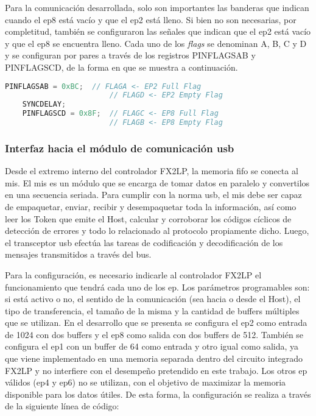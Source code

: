 	Para la comunicación desarrollada, solo son importantes las banderas que indican cuando el \acrshort{ep}8 está vacío y que el \acrshort{ep}2 está lleno. Si bien no son necesarias, por completitud, también se configuraron las señales que indican que el \acrshort{ep}2 está vacío y que el \acrshort{ep}8 se encuentra lleno. Cada uno de los \textit{flags} se denominan A, B, C y D y se configuran por pares a través de los registros PINFLAGSAB y PINFLAGSCD, de la forma en que se muestra a continuación.
	
	\begin{lstlisting}[language=C,backgroundcolor=\color{gray!30}]
	PINFLAGSAB = 0xBC;	// FLAGA <- EP2 Full Flag
						// FLAGD <- EP2 Empty Flag
	SYNCDELAY;
	PINFLAGSCD = 0x8F;	// FLAGC <- EP8 Full Flag
						// FLAGB <- EP8 Empty Flag
	\end{lstlisting}
	
	
\subsubsection{Interfaz hacia el módulo de comunicación \acrshort{usb}}
	Desde el extremo interno del controlador FX2LP, la memoria \acrshort{fifo} se conecta al \acrfull{mis}. El \acrshort{mis} es un módulo que se encarga de tomar datos en paralelo y convertilos en una secuencia seriada. Para cumplir con la norma \acrshort{usb}, el \acrshort{mis} debe ser capaz de empaquetar, enviar, recibir y desempaquetar toda la información, así como leer los Token que emite el Host, calcular y corroborar los códigos cíclicos de detección de errores y todo lo relacionado al protocolo propiamente dicho. Luego, el transceptor \acrshort{usb} efectúa las tareas de codificación y decodificación de los mensajes transmitidos a través del bus.
	
	Para la configuración, es necesario indicarle al controlador FX2LP el funcionamiento que tendrá cada uno de los \acrshort{ep}. Los parámetros programables son: si está activo o no, el sentido de la comunicación (sea hacia o desde el Host), el tipo de transferencia, el tamaño de la misma y la cantidad de buffers múltiples que se utilizan. En el desarrollo que se presenta se configura el \acrshort{ep}2 como entrada de \SI{1024}{\byte} con dos buffers y el \acrshort{ep}8 como salida con dos buffers de \SI{512}{\byte}. También se configura el \acrshort{ep}1 con un buffer de \SI{64}{\byte} como entrada y otro igual como salida, ya que viene implementado en una memoria separada dentro del circuito integrado FX2LP y no interfiere con el desempeño pretendido en este trabajo. Los otros \acrshort{ep} válidos (\acrshort{ep}4 y \acrshort{ep}6) no se utilizan, con el objetivo de maximizar la memoria disponible para los datos útiles. De esta forma, la configuración se realiza a través de la siguiente línea de código:
	
